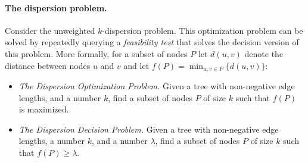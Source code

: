 \documentclass[11pt,a4paper]{article}
\theoremstyle{definition}
\theoremstyle{remark}
\begin{document}
\vspace{-0.1in}
\paragraph{The dispersion problem.}
Consider the unweighted $k$-dispersion problem. This optimization problem can be solved by repeatedly querying a {\em feasibility test} that solves the decision version of this problem. More formally, for a subset of nodes $P$ let $d(u,v)$ denote the distance between nodes $u$ and $v$ and let $f(P)=\min_{u,v\in P} \{d(u,v)\}$:


\begin{itemize} 
\item {\em The Dispersion Optimization Problem.} Given a tree with non-negative edge lengths, and a  number $k$, find a subset of nodes $P$ of size $k$  such that  $f(P)$ is maximized. 

\item  {\em The Dispersion Decision Problem.}  Given a tree with non-negative edge lengths, a number $k$, and a number $\lambda$, find a subset of nodes  $P$ of size $k$ such that  $f(P)\geq\lambda$. 
\end{itemize}
\end{document}
